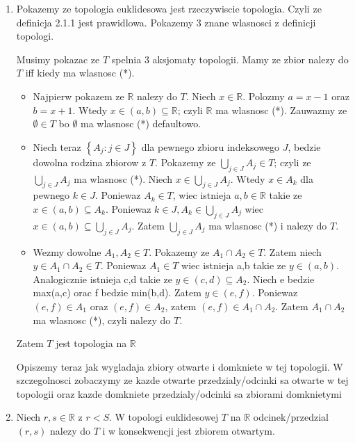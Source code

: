 \documentclass{article}
\begin{document}
\begin{enumerate}[label=(\alph*)] %
    \item Pokazemy ze topologia euklidesowa jest rzeczywiscie topologia. Czyli ze definicja 2.1.1 jest prawidlowa. Pokazemy 3 znane wlasnosci z definicji topologi.

        Musimy pokazac ze $T$ spelnia 3 aksjomaty topologii. Mamy ze zbior nalezy do $T$ iff kiedy ma wlasnosc (*).

        \begin{itemize}
            \item Najpierw pokazem ze $\mathbb{R}$ nalezy do $T$. Niech $x \in \mathbb{R}$. Polozmy $a = x-1$ oraz $b = x+1$. Wtedy $x \in (a,b) \subseteq \mathbb{R}$; czyli $\mathbb{R}$ ma wlasnosc (*). Zauwazmy ze $\emptyset \in T$ bo $\emptyset$ ma wlasnosc (*) defaultowo.

            \item Niech teraz $\left\{ A_{j}: j \in J \right\}$ dla pewnego zbioru indeksowego $J$, bedzie dowolna rodzina zbiorow z $T$. Pokazemy ze $\bigcup\limits_{j \in J}A_{j} \in T$; czyli ze $ \bigcup\limits_{j \in J}A_{j}$ ma wlasnosc (*). Niech $x \in \bigcup\limits_{j \in J}A_{j}$. Wtedy $x \in A_{k}$ dla pewnego $k \in J$. Poniewaz $A_{k} \in T$, wiec istnieja $a,b \in \mathbb{R}$ takie ze $x\in (a,b) \subseteq A_{k}$. Poniewaz $k \in J, A_{k} \in   \bigcup\limits_{j \in J}A_{j}$ wiec $x \in (a,b) \subseteq \bigcup\limits_{j \in J}A_{j} $. Zatem $\bigcup\limits_{j \in J}A_{j}$ ma wlasnosc (*) i nalezy do $T$.

            \item Wezmy dowolne $A_{1}, A_{2} \in T$. Pokazemy ze $A_{1} \cap A_{2} \in T$. Zatem niech $y \in A_{1} \cap A_{2} \in T$. Poniewaz $A_{1} \in T$ wiec istnieja a,b takie ze $y \in (a,b)$. Analogicznie istnieja c,d takie ze $y \in (c,d) \subseteq A_{2}$. Niech e bedzie max(a,c) orac f bedzie min(b,d). Zatem $y \in (e,f)$. Poniewaz $(e,f) \in A_{1}$ oraz $(e,f) \in A_{2}$, zatem $(e,f) \in A_{1} \cap A_{2}$. Zatem $A_{1} \cap A_{2}$ ma wlasnosc (*), czyli nalezy do $T$.
        \end{itemize}
        Zatem $T$ jest topologia na $\mathbb{ R }$

        Opiszemy teraz jak wygladaja zbiory otwarte i domkniete w tej topologii. W szczegolnosci zobaczymy ze kazde otwarte przedzialy/odcinki sa otwarte w tej topologii oraz kazde domkniete przedzialy/odcinki sa zbiorami domknietymi
    \item Niech $r,s \in \mathbb{R}$ z $r<S$. W topologi euklidesowej $T$ na $\mathbb{R}$ odcinek/przedzial $(r,s)$ nalezy do $T$ i w konsekwencji jest zbiorem otwartym.


\end{enumerate}
\end{document}
